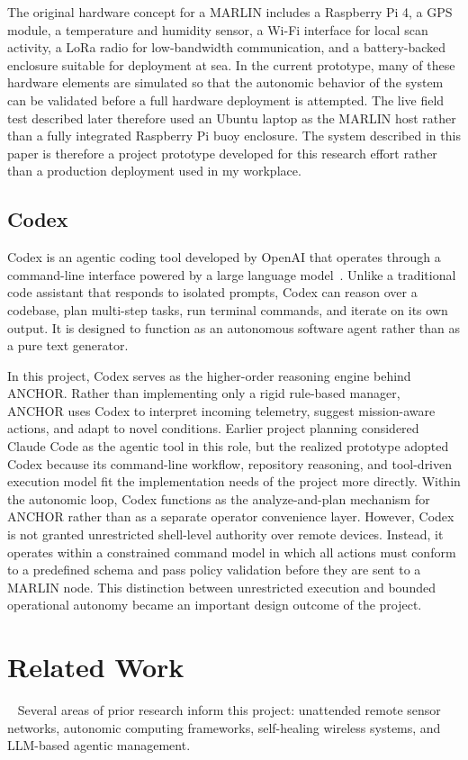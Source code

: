 \documentclass[journal]{IEEEtran}
\begin{document}
The original hardware concept for a MARLIN includes a Raspberry Pi 4, a GPS module, a temperature and humidity sensor, a Wi-Fi interface for local scan activity, a LoRa radio for low-bandwidth communication, and a battery-backed enclosure suitable for deployment at sea. In the current prototype, many of these hardware elements are simulated so that the autonomic behavior of the system can be validated before a full hardware deployment is attempted. The live field test described later therefore used an Ubuntu laptop as the MARLIN host rather than a fully integrated Raspberry Pi buoy enclosure. The system described in this paper is therefore a project prototype developed for this research effort rather than a production deployment used in my workplace.

\subsection{Codex}
Codex is an agentic coding tool developed by OpenAI that operates through a command-line interface powered by a large language model~\cite{openai_codex_2025}. Unlike a traditional code assistant that responds to isolated prompts, Codex can reason over a codebase, plan multi-step tasks, run terminal commands, and iterate on its own output. It is designed to function as an autonomous software agent rather than as a pure text generator.

In this project, Codex serves as the higher-order reasoning engine behind ANCHOR. Rather than implementing only a rigid rule-based manager, ANCHOR uses Codex to interpret incoming telemetry, suggest mission-aware actions, and adapt to novel conditions. Earlier project planning considered Claude Code as the agentic tool in this role, but the realized prototype adopted Codex because its command-line workflow, repository reasoning, and tool-driven execution model fit the implementation needs of the project more directly. Within the autonomic loop, Codex functions as the analyze-and-plan mechanism for ANCHOR rather than as a separate operator convenience layer. However, Codex is not granted unrestricted shell-level authority over remote devices. Instead, it operates within a constrained command model in which all actions must conform to a predefined schema and pass policy validation before they are sent to a MARLIN node. This distinction between unrestricted execution and bounded operational autonomy became an important design outcome of the project.

\section{Related Work}~\label{related}
Several areas of prior research inform this project: unattended remote sensor networks, autonomic computing frameworks, self-healing wireless systems, and LLM-based agentic management.
\end{document}

